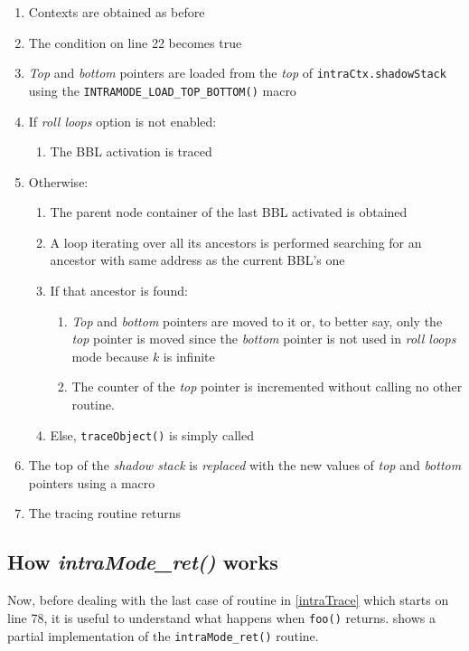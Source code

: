 \documentclass[a4paper,10pt]{report}
\begin{document}
\begin{enumerate}
\item Contexts are obtained as before
\item The condition on line 22 becomes true
\item \emph{Top} and \emph{bottom} pointers are loaded from the \emph{top}
of \verb|intraCtx.shadowStack| using the \verb|INTRAMODE_LOAD_TOP_BOTTOM()| macro
\item If \emph{roll loops} option is not enabled:
\begin{enumerate}
\item The BBL activation is traced
\end{enumerate}
\item Otherwise:
\begin{enumerate}
\item The parent node container of the last BBL activated is obtained
\item A loop iterating over all its ancestors is performed 
searching for an ancestor with same address as the current BBL's one
\item If that ancestor is found:
\begin{enumerate}
\item \emph{Top} and \emph{bottom}
pointers are moved to it or, to better say, only the \emph{top} pointer
is moved since the \emph{bottom} pointer is not used in \emph{roll loops} mode
because $k$ is infinite
\item The counter of the \emph{top} pointer
is incremented without calling no other routine.
\end{enumerate}
\item Else, \verb|traceObject()| is simply called
\end{enumerate}
\item The top of the \emph{shadow stack} is \emph{replaced} with the new values 
of \emph{top} and \emph{bottom} pointers using a macro
\item The tracing routine returns
\end{enumerate}

\subsection{How \emph{intraMode\_ret()} works}

Now, before dealing with the last case of routine in \cref{intraTrace} 
which starts on line 78, it is useful to understand 
what happens when \verb|foo()| returns.  shows
a partial implementation of the \verb|intraMode_ret()| routine.
\end{document}
